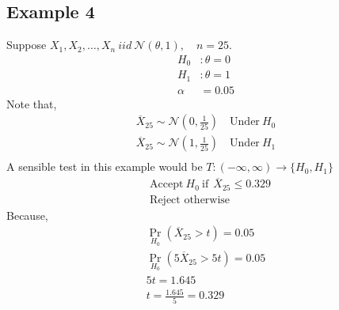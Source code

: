 \documentclass[12pt,a4paper,fleqn]{article}
\begin{document}
 \subsection{Example 4} 
Suppose \(X_{1},X_{2},\ldots,X_{n} \ iid \ \mathcal{N}(\theta,1), \quad n = 25 \).  
\begin{align*}
    H_{0} &: \theta =0\\
    H_{1} &: \theta =1\\
    \alpha &= 0.05 
\end{align*}
Note that, 
\begin{align*}
    \overline{X}_{25} \sim \mathcal{N}\left( 0,\frac{1}{25} \right) \quad \text{Under} \ H_{0}\\
    \overline{X}_{25} \sim \mathcal{N}\left( 1,\frac{1}{25} \right)
    \quad \text{Under} \ H_{1}\\ 
\end{align*}
A sensible test in this example would be \(T : (-\infty, \infty) \to \{H_{0},H_{1}\} \)  
 \begin{align*}
    &\text{Accept} \ H_{0} \ \text{if} \ \ \overline{X}_{25} \leq 0.329 \\
    &\text{Reject otherwise} 
\end{align*}
Because,
 \begin{align*}
    \Pr_{H_{0}}\left( \overline{X}_{25} >t  \right) = 0.05 \\
    \Pr_{H_{0}}\left(  5\overline{X}_{25} >5t  \right) = 0.05 \\
    5t=1.645\\
    t= \frac{1.645}{5}= 0.329 
\end{align*}
\end{document}
